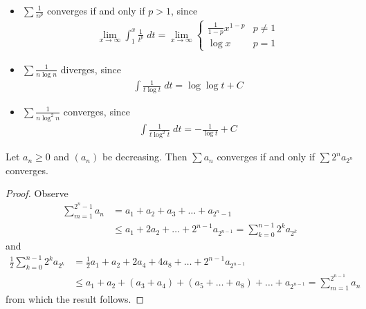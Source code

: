 \documentclass{../template/note}
\begin{document}
    \begin{example}
        \begin{itemize}
            \item \(\sum \frac 1 {n^p}\) converges if and only if \(p > 1\), since
            \begin{align*}
                \lim_{x \to \infty}\int_1^x \frac{1}{t^p} \; dt = \lim_{x \to \infty} \begin{cases}
                    \frac{1}{1-p}x^{1-p} & p \neq 1 \\
                    \log x & p = 1
                \end{cases}
            \end{align*}
            \item \(\sum \frac 1 {n \log n}\) diverges, since
            \begin{align*}
                \int \frac 1 {t \log t} \; dt = \log \log t + C
            \end{align*}
            \item \(\sum \frac 1 {n \log^2 n}\) converges, since
            \begin{align*}
                \int \frac 1 {t \log^2 t} \; dt = -\frac 1 {\log t} + C
            \end{align*}
        \end{itemize}
    \end{example}
    
    \begin{proposition}
        Let \(a_n \geq 0\) and \((a_n)\) be decreasing. Then \(\sum a_n\) converges if and only if \(\sum 2^n a_{2^n}\) converges.
    \end{proposition}
    
    \begin{proof}
        Observe
        \begin{align*}
            \sum_{m=1}^{2^n-1} a_n &= a_1 + a_2 + a_3 + \dots + a_{2^n-1} \\
            &\leq a_1 + 2a_2 + \dots + 2^{n-1}a_{2^{n-1}} = \sum_{k=0}^{n-1} 2^k a_{2^k}
        \end{align*}
        and
        \begin{align*}
            \frac{1}{2}\sum_{k=0}^{n-1} 2^k a_{2^k} &= \frac 1 2 a_1 + a_2 + 2a_4 + 4a_8 + \dots + 2^{n-1}a_{2^{n-1}} \\
            &\leq a_1 + a_2 + (a_3 + a_4) + (a_5 + \dots + a_8) + \dots + a_{2^{n-1}} = \sum_{m=1}^{2^{n-1}} a_n
        \end{align*}
        from which the result follows.   
    \end{proof}
    
\end{document}
